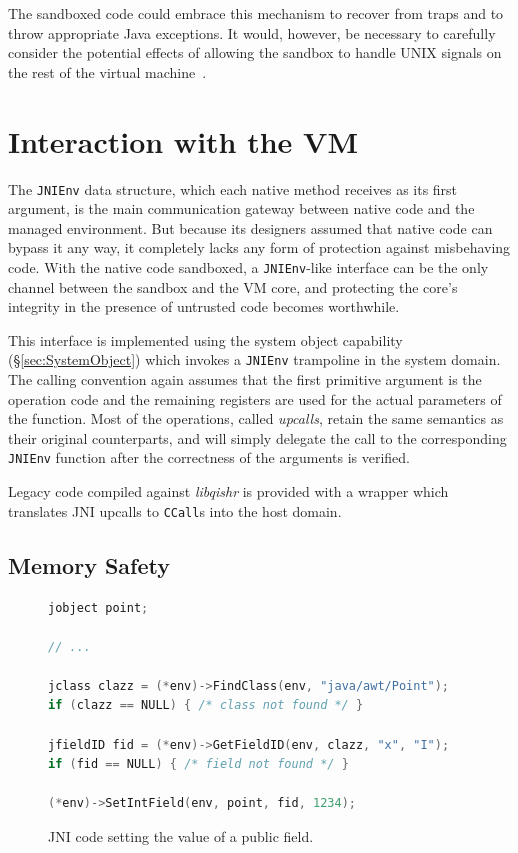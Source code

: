 \documentclass[a4paper,12pt,twoside,openright]{report}
\newcommand{\insn}[1]{\texttt{#1}}
\newcommand{\tool}[1]{\emph{#1}}
\newcommand{\lib}[1]{\tool{lib#1}}
\begin{document}
The sandboxed code could embrace this mechanism to recover from traps and to throw appropriate Java exceptions. It would, however, be necessary to carefully consider the potential effects of allowing the sandbox to handle UNIX signals on the rest of the virtual machine~\cite{989483}.

\section{Interaction with the VM}

The \texttt{JNIEnv} data structure, which each native method receives as its first argument, is the main communication gateway between native code and the managed environment. But because its designers assumed that native code can bypass it any way, it completely lacks any form of protection against misbehaving code. With the native code sandboxed, a \texttt{JNIEnv}-like interface can be the only channel between the sandbox and the VM core, and protecting the core's integrity in the presence of untrusted code becomes worthwhile.

This interface is implemented using the system object capability (\S\ref{sec:SystemObject}) which invokes a \texttt{JNIEnv} trampoline in the system domain. The calling convention again assumes that the first primitive argument is the operation code and the remaining registers are used for the actual parameters of the function. Most of the operations, called \emph{upcalls}, retain the same semantics as their original counterparts, and will simply delegate the call to the corresponding \texttt{JNIEnv} function after the correctness of the arguments is verified. 

Legacy code compiled against \lib{qishr} is provided with a wrapper which translates JNI upcalls to \insn{CCall}s into the host domain.

\subsection{Memory Safety}
\label{sec:MemorySafety}

\begin{figure}[t]
	\begin{lstlisting}[language=C]
jobject point;

// ...

jclass clazz = (*env)->FindClass(env, "java/awt/Point");
if (clazz == NULL) { /* class not found */ }

jfieldID fid = (*env)->GetFieldID(env, clazz, "x", "I");
if (fid == NULL) { /* field not found */ }

(*env)->SetIntField(env, point, fid, 1234);
	\end{lstlisting}
	\caption{JNI code setting the value of a public field.}
	\label{listing:SetFieldValue}
\end{figure}
\end{document}
